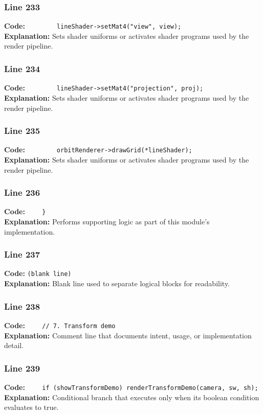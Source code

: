 \documentclass[11pt,a4paper]{article}
\begin{document}
\subsubsection*{Line 233}
\textbf{Code:} \verb|        lineShader->setMat4("view", view);|\\
\textbf{Explanation:} Sets shader uniforms or activates shader programs used by the render pipeline.

\subsubsection*{Line 234}
\textbf{Code:} \verb|        lineShader->setMat4("projection", proj);|\\
\textbf{Explanation:} Sets shader uniforms or activates shader programs used by the render pipeline.

\subsubsection*{Line 235}
\textbf{Code:} \verb|        orbitRenderer->drawGrid(*lineShader);|\\
\textbf{Explanation:} Sets shader uniforms or activates shader programs used by the render pipeline.

\subsubsection*{Line 236}
\textbf{Code:} \verb|    }|\\
\textbf{Explanation:} Performs supporting logic as part of this module's implementation.

\subsubsection*{Line 237}
\textbf{Code:} \texttt{(blank line)}\\
\textbf{Explanation:} Blank line used to separate logical blocks for readability.

\subsubsection*{Line 238}
\textbf{Code:} \verb|    // 7. Transform demo|\\
\textbf{Explanation:} Comment line that documents intent, usage, or implementation detail.

\subsubsection*{Line 239}
\textbf{Code:} \verb|    if (showTransformDemo) renderTransformDemo(camera, sw, sh);|\\
\textbf{Explanation:} Conditional branch that executes only when its boolean condition evaluates to true.
\end{document}
